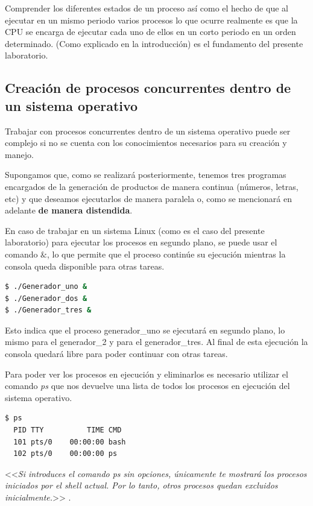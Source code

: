 Comprender los diferentes estados de un proceso así como el hecho de que al ejecutar en un mismo periodo varios procesos lo que ocurre realmente es que la CPU se encarga de ejecutar cada uno de ellos en un corto periodo en un orden determinado. (Como explicado en la introducción) es el fundamento del presente laboratorio.

\subsection{Creación de procesos concurrentes dentro de un sistema operativo}
Trabajar con procesos concurrentes dentro de un sistema operativo puede ser complejo si no se cuenta con los conocimientos necesarios para su creación y manejo.

Supongamos que, como se realizará posteriormente, tenemos tres programas encargados de la generación de productos de manera continua (números, letras, etc) y que deseamos ejecutarlos de manera paralela o, como se mencionará en adelante \textbf{de manera distendida}.

En caso de trabajar en un sistema Linux (como es el caso del presente laboratorio) para ejecutar los procesos en segundo plano, se puede usar el comando $\&$, lo que permite que el proceso continúe su ejecución mientras la consola queda disponible para otras tareas.

\begin{lstlisting}[language=bash, style=CodeStyle]
$ ./Generador_uno &
$ ./Generador_dos &
$ ./Generador_tres &
\end{lstlisting}

Esto indica que el proceso generador\_uno se ejecutará en segundo plano, lo mismo para el generador\_2 y para el generador\_tres. Al final de esta ejecución la consola quedará libre para poder continuar con otras tareas.

Para poder ver los procesos en ejecución y eliminarlos es necesario utilizar el comando \textit{ps} que nos devuelve una lista de todos los procesos en ejecución del sistema operativo.

\begin{lstlisting}[language=bash, style=CodeStyle]
$ ps
  PID TTY          TIME CMD
  101 pts/0    00:00:00 bash
  102 pts/0    00:00:00 ps
\end{lstlisting}

<<\textit{Si introduces el comando ps sin opciones, únicamente te mostrará los procesos iniciados por el shell actual. Por lo tanto, otros procesos quedan excluidos inicialmente.}>> \parencite{PS}.

